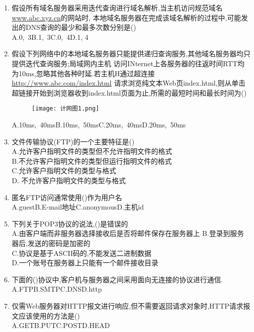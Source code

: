 \documentclass[12pt, a4paper, oneside, UTF8]{ctexbook}
\begin{document}
\begin{enumerate}
    \item 假设所有域名服务器采用迭代查询进行域名解析,当主机访问规范域名\underline{www.abc.xyz.cn}的网站时,
    本地域名服务器在完成该域名解析的过程中,可能发出的DNS查询的最少和最多次数分别是() \\
    A.0,\ 3\qquad B.1,\ 3\qquad C.0,\ 4\qquad D.1, 4

    \item 假设下列网络中的本地域名服务器只能提供递归查询服务,其他域名服务器均只提供迭代查询服务;局域网内主机
    访问INternet上各服务器的往返时间RTT均为10ms,忽略其他各种时延.若主机H通过超连接\underline{http://www.abc.com/index.html}
    请求浏览纯文本Web页index.html,则从单击超链接开始到浏览器收到index.html页面为止,所需的最短时间和最长时间为()  \\
    \begin{figure}[htbp]
        \centering
        \texttt{[image: 计网图1.png]}
    \end{figure}
    A.10ms,\ 40ms\qquad B.10ms,\ 50ms\qquad C.20ms,\ 40ms\qquad D.20ms,\ 50ms

    \item 文件传输协议(FTP)的一个主要特征是() \\
    A.允许客户指明文件的类型但不允许指明文件的格式 \\
    B.不允许客户指明文件的类型但运行指明文件的格式 \\
    C.允许客户指明文件的类型与格式 \\
    D. 不允许客户指明文件的类型与格式 

    \item 匿名FTP访问通常使用()作为用户名 \\
    A.guest\qquad B.E-mail地址\qquad C.anonymous\qquad D.主机id

    \item 下列关于POP3协议的说法,()是错误的 \\
    A.由客户端而非服务器选择接收后是否将邮件保存在服务器上
    B.登录到服务器后,发送的密码是加密的 \\
    C.协议是基于ASCII码的,不能发送二进制数据 \\
    D.一个账号在服务器上只能有一个邮件接收目录 

    \item 下面的()协议中,客户机与服务器之间采用面向无连接的协议进行通信. \\
    A.FTP\qquad B.SMTP\qquad C.DNS\qquad D.http

    \item 仅需Web服务器对HTTP报文进行响应,但不需要返回请求对象时,HTTP请求报文应该使用的方法是() \\
    A.GET\qquad B.PUT\qquad C.POST\qquad D.HEAD


\end{enumerate}
\end{document}
